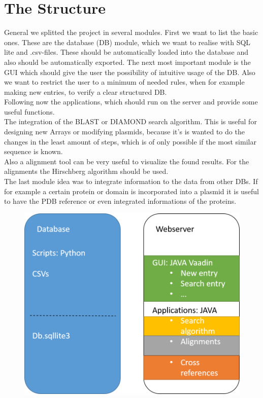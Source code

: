 \documentclass[]{article}
\begin{document}
\section{ The Structure}
General we splitted the project in several modules. First we want to list the basic ones. These are the database (DB) module, which we want to realise with SQL lite and .csv-files. These should be automatically loaded into the database and also should be automatically exported.
The next most important module is the GUI which should give the user the possibility of intuitive usage of the DB. Also we want to restrict the user to a minimum of needed rules, when for example making new entries, to verify a clear structured DB.\\
Following now the applications, which should run on the server and provide some useful functions.\\
The integration of the BLAST or DIAMOND search algorithm. This is useful for designing new Arrays or modifying plasmids, because it's is wanted to do the changes in the least amount of steps, which is of only possible if the most similar sequence is known.\\
Also a alignment tool can be very useful to visualize the found results. For the alignments the Hirschberg algorithm should be used.\\
The last module idea was to integrate information to the data from other DBs. If for example a certain protein or domain is incorporated into a plasmid it is useful to have the PDB reference or even integrated informations of the proteins.
	\begin{figure}[h]
		\includegraphics[width=\textwidth]{img/Structure.png}
	\end{figure}
\end{document}
